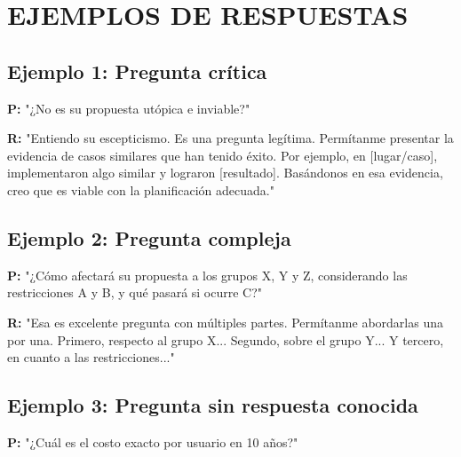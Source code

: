 \documentclass[a4paper,11pt]{article}
\begin{document}
\section{EJEMPLOS DE RESPUESTAS}

\vspace{0.2cm}

\subsection{Ejemplo 1: Pregunta crítica}

\vspace{0.2cm}

\textbf{P:} "¿No es su propuesta utópica e inviable?"

\vspace{0.2cm}

\textbf{R:} "Entiendo su escepticismo. Es una pregunta legítima. Permítanme presentar la evidencia de casos similares que han tenido éxito. Por ejemplo, en [lugar/caso], implementaron algo similar y lograron [resultado]. Basándonos en esa evidencia, creo que es viable con la planificación adecuada."

\vspace{0.2cm}

\subsection{Ejemplo 2: Pregunta compleja}

\vspace{0.2cm}

\textbf{P:} "¿Cómo afectará su propuesta a los grupos X, Y y Z, considerando las restricciones A y B, y qué pasará si ocurre C?"

\vspace{0.2cm}

\textbf{R:} "Esa es excelente pregunta con múltiples partes. Permítanme abordarlas una por una. Primero, respecto al grupo X... Segundo, sobre el grupo Y... Y tercero, en cuanto a las restricciones..."

\vspace{0.2cm}

\subsection{Ejemplo 3: Pregunta sin respuesta conocida}

\vspace{0.2cm}

\textbf{P:} "¿Cuál es el costo exacto por usuario en 10 años?"
\end{document}

